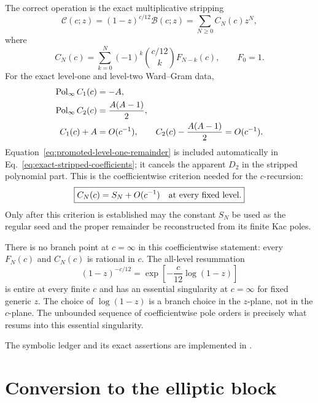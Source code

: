 \documentclass[11pt]{article}
\newcommand{\B}{\mathcal B}
\begin{document}
The correct operation is the exact multiplicative stripping
\begin{equation}
 \mathcal C(c;z)
 =(1-z)^{c/12}\B(c;z)
 =\sum_{N\ge0}C_N(c)z^N,
 \label{eq:exact-multiplicative-local-stripping}
\end{equation}
where
\begin{equation}
 C_N(c)=
 \sum_{k=0}^{N}(-1)^k\binom{c/12}{k}F_{N-k}(c),
 \qquad F_0=1.
 \label{eq:exact-stripped-coefficients}
\end{equation}
For the exact level-one and level-two Ward--Gram data,
\begin{align}
 \operatorname{Pol}_{\infty}C_1(c)&=-A,
 \notag\\
 \operatorname{Pol}_{\infty}C_2(c)&=\frac{A(A-1)}2,
 \notag\\
 C_1(c)+A&=O(c^{-1}),
 \qquad
 C_2(c)-\frac{A(A-1)}2=O(c^{-1}).
 \label{eq:stripped-polynomial-parts-level-two}
\end{align}
Equation~\eqref{eq:promoted-level-one-remainder} is included automatically
in Eq.~\eqref{eq:exact-stripped-coefficients}; it cancels the apparent
\(D_2\) in the stripped polynomial part.  This is the coefficientwise
criterion needed for the \(c\)-recursion:
\begin{equation}
 \boxed{
 C_N(c)=S_N+O(c^{-1})
 \quad\hbox{at every fixed level}.}
 \label{eq:proper-recursion-normalization-criterion}
\end{equation}
Only after this criterion is established may the constant \(S_N\) be used
as the regular seed and the proper remainder be reconstructed from its
finite Kac poles.

There is no branch point at \(c=\infty\) in this coefficientwise statement:
every \(F_N(c)\) and \(C_N(c)\) is rational in \(c\).  The all-level
resummation
\begin{equation}
 (1-z)^{-c/12}
 =\exp\!\left[-\frac c{12}\log(1-z)\right]
 \label{eq:resummed-essential-infinity}
\end{equation}
is entire at every finite \(c\) and has an essential singularity at
\(c=\infty\) for fixed generic \(z\).  The choice of \(\log(1-z)\) is a
branch choice in the \(z\)-plane, not in the \(c\)-plane.  The unbounded
sequence of coefficientwise pole orders is precisely what resums into this
essential singularity.

The symbolic ledger and its exact assertions are implemented in
.

\section{Conversion to the elliptic block}
\end{document}
